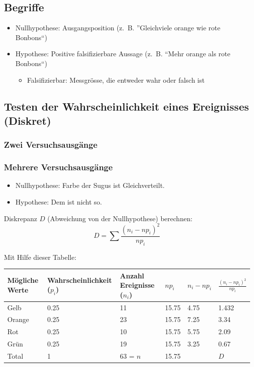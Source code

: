 \subsection{Begriffe}
\begin{itemize}
  \item Nullhypothese: Ausgangsposition
    (z.~B. ''Gleichviele orange wie rote Bonbons``)
  \item Hypothese: Positive falsifizierbare Aussage
    (z.~B. ``Mehr orange als rote Bonbons``)
  \begin{itemize}
    \item Falsifizierbar: Messgrösse, die entweder wahr oder falsch ist
  \end{itemize}
\end{itemize}

\subsection{Testen der Wahrscheinlichkeit eines Ereignisses (Diskret)}
\subsubsection{Zwei Versuchsausgänge}
\subsubsection{Mehrere Versuchsausgänge}
\begin{itemize}
  \item Nullhypothese: Farbe der Sugus ist Gleichverteilt.
  \item Hypothese: Dem ist nicht so.
\end{itemize}
Diskrepanz $D$ (Abweichung von der Nullhypothese) berechnen:
\[ D = \sum \frac{(n_i - np_i)^2}{np_i} \]

Mit Hilfe dieser Tabelle:

\begin{tabular}{|l|l|l|l|l|l|}
  \hline
  Mögliche Werte & Wahrscheinlichkeit ($p_i$) & Anzahl Ereignisse ($n_i$) & $np_i$ & $n_i - np_i$ & $\frac{(n_i - np_i)^2}{np_i}$ \\
  \hline
  \hline
  Gelb    &   0.25    &  11       &   15.75    &  4.75    &  1.432 \\
  Orange  &   0.25    &  23       &   15.75    &  7.25    &  3.34  \\
  Rot     &   0.25    &  10       &   15.75    &  5.75    &  2.09  \\
  Grün    &   0.25    &  19       &   15.75    &  3.25    &  0.67  \\
  \hline
  \hline
  Total   &   1       &  63 = $n$ &   15.75    &          & $D$    \\
  \hline
\end{tabular}


